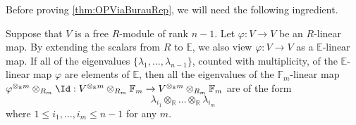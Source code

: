 \documentclass{amsart}
\begin{document}
Before proving \cref{thm:OPViaBurauRep}, we will need the following ingredient.

\begin{lem}\label{lem:TensorProductOfEigenvalues}
     Suppose that $V$ is a free $R$-module of rank $n-1$. Let $\varphi: V\to V$ be an $R$-linear map. By extending the scalars from $R$ to $\mathbb{E}$, we also view $\varphi: V \to V$ as a $\mathbb{E}$-linear map. If all of the eigenvalues $\{\lambda_1,\dots,\lambda_{n-1}\}$, counted with multiplicity, of the $\mathbb{E}$-linear map $\varphi$ are elements of $\mathbb{E}$, then all the eigenvalues of the $\mathbb{F}_m$-linear map $\varphi^{\otimes_\mathbb{R} m} \otimes_{R_m} \Id : V^{\otimes_{\mathbb{R}} m} \otimes_{R_m} \mathbb{F}_m \to V^{\otimes_{\mathbb{R}} m} \otimes_{R_m} \mathbb{F}_m$ are of the form
     \[
     \lambda_{i_1} \otimes_{\mathbb{R}} \dots \otimes_{\mathbb{R}}\lambda_{i_m} 
     \]
     where $1 \leq i_1,\dots,i_m \leq n-1$ for any $m$.
\end{lem}
\end{document}
